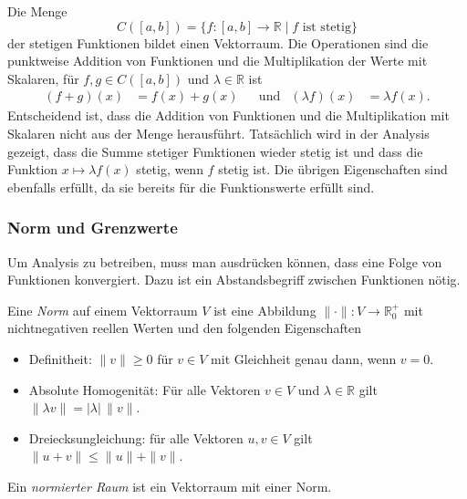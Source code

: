 \begin{beispiel}
Die Menge
\[
C([a,b])
=
\{f\colon[a,b]\to\mathbb{R}\mid \text{$f$ ist stetig}\}
\]
der stetigen Funktionen bildet einen Vektorraum.
Die Operationen sind die punktweise Addition von Funktionen und die
Multiplikation der Werte mit Skalaren, für $f,g\in C([a,b])$ und
$\lambda\in \mathbb{R}$ ist
\begin{align*}
(f+g)(x) &= f(x)+g(x)
&&\text{und}&
(\lambda f)(x) &= \lambda f(x).
\end{align*}
Entscheidend ist, dass die Addition von Funktionen und die Multiplikation
mit Skalaren nicht aus der Menge herausführt.
Tatsächlich wird in der Analysis gezeigt, dass die Summe stetiger Funktionen
wieder stetig ist und dass die Funktion $x\mapsto \lambda f(x)$ stetig,
wenn $f$ stetig ist.
Die übrigen Eigenschaften sind ebenfalls erfüllt, da sie bereits für die
Funktionswerte erfüllt sind.
\end{beispiel}

%
%
\subsubsection{Norm und Grenzwerte}
Um Analysis zu betreiben, muss man ausdrücken können, dass eine Folge
von Funktionen konvergiert.
Dazu ist ein Abstandsbegriff zwischen Funktionen nötig.

\begin{definition}
Eine {\em Norm} auf einem Vektorraum $V$ ist eine Abbildung
%
$\|\cdot\|\colon V\to\mathbb{R}^+_0$ mit nichtnegativen reellen Werten
und den folgenden Eigenschaften
\begin{itemize}
\item Definitheit: $\|v\|\ge 0$ für $v\in V$ mit Gleichheit 
genau dann, wenn $v=0$.
%
\item Absolute Homogenität: Für alle Vektoren $v\in V$ und
%
$\lambda\in\mathbb{R}$ gilt $\|\lambda v\| = |\lambda|\, \|v\|$.
\item Dreiecksungleichung: für alle Vektoren $u,v\in V$ gilt
%
$\|u+v\|\le \|u\|+\|v\|$.
\end{itemize}
Ein {\em normierter Raum} ist ein Vektorraum mit einer Norm.
%
\end{definition}

